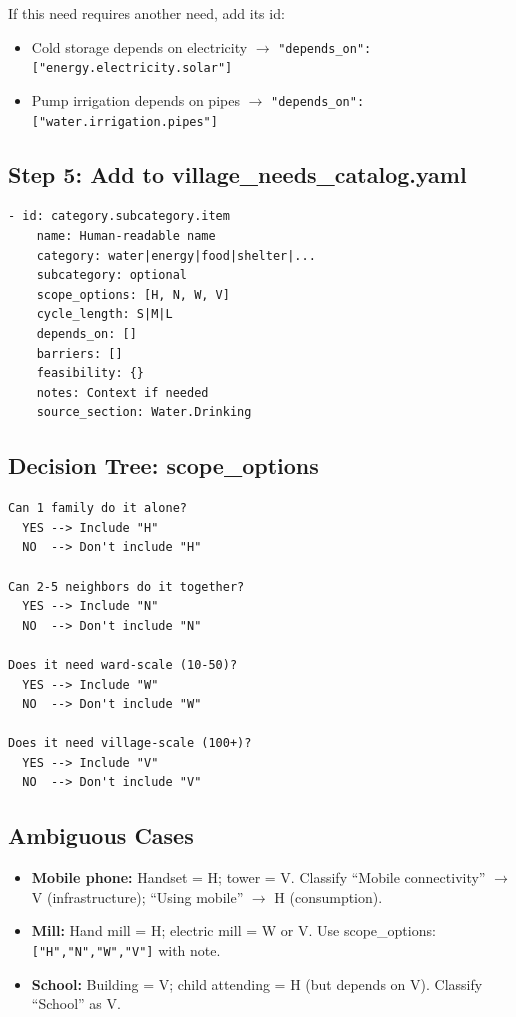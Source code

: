 \documentclass[11pt,a4paper]{article}
\begin{document}
If this need requires another need, add its id:

\begin{itemize}
    \item Cold storage depends on electricity $\rightarrow$ \texttt{"depends\_on": ["energy.electricity.solar"]}
    \item Pump irrigation depends on pipes $\rightarrow$ \texttt{"depends\_on": ["water.irrigation.pipes"]}
\end{itemize}

\subsection{Step 5: Add to village\_needs\_catalog.yaml}

\begin{verbatim}
- id: category.subcategory.item
    name: Human-readable name
    category: water|energy|food|shelter|...
    subcategory: optional
    scope_options: [H, N, W, V]
    cycle_length: S|M|L
    depends_on: []
    barriers: []
    feasibility: {}
    notes: Context if needed
    source_section: Water.Drinking
\end{verbatim}

\subsection{Decision Tree: scope\_options}

\begin{verbatim}
Can 1 family do it alone?
  YES --> Include "H"
  NO  --> Don't include "H"

Can 2-5 neighbors do it together?
  YES --> Include "N"
  NO  --> Don't include "N"

Does it need ward-scale (10-50)?
  YES --> Include "W"
  NO  --> Don't include "W"

Does it need village-scale (100+)?
  YES --> Include "V"
  NO  --> Don't include "V"
\end{verbatim}

\subsection{Ambiguous Cases}

\begin{itemize}
    \item \textbf{Mobile phone:} Handset = H; tower = V. Classify ``Mobile connectivity'' $\rightarrow$ V (infrastructure); ``Using mobile'' $\rightarrow$ H (consumption).
    \item \textbf{Mill:} Hand mill = H; electric mill = W or V. Use scope\_options: \texttt{["H","N","W","V"]} with note.
    \item \textbf{School:} Building = V; child attending = H (but depends on V). Classify ``School'' as V.
\end{itemize}
\end{document}

